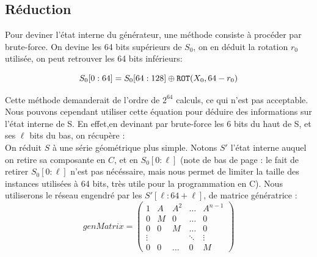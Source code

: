 \documentclass[preprint]{iacrtrans}
\begin{document}
\subsection{Réduction}
Pour deviner l'état interne du générateur, une méthode consiste à procéder par brute-force. On devine les 64 bits supérieurs de $S_0$, on en déduit la rotation $r_0$ utilisée, on peut retrouver  les 64 bits inférieurs:

\begin{equation}
   S_0[0:64] = S_0[64:128] \oplus \texttt{ROT}(X_0 , 64 - r_0) \\
\end{equation}

Cette méthode demanderait de l'ordre de $2^{64}$ calculs, ce qui n'est pas acceptable. Nous pouvons cependant utiliser cette équation pour déduire des informations sur l'état interne de S. En effet,en devinant par brute-force les 6 bits du haut de S, et ses $\ell$ bits du bas, on récupère :\\%

On réduit $S$ à une série géométrique plus simple. Notons $S'$ l'état interne auquel on retire sa composante en $C$, et en $S_0[0:\ell]$ (note de bas de page : le fait de retirer $S_0[0:\ell]$ n'est pas nécéssaire, mais nous permet de limiter la taille des instances utilisées à 64 bits, très utile pour la programmation en C). Nous utiliserons le réseau engendré par les $S'[\ell : 64 + \ell]$, de matrice génératrice :\\
\begin{equation}
genMatrix =
\begin{pmatrix} 
1 & A & A ^2 & \dots & A ^{n- 1}\\
0 & M & 0 & \dots & 0\\
0 & 0 & M & \dots & 0\\
\vdots & & & \ddots & \vdots\\
0 & 0 & \dots & 0 & M
\end{pmatrix}
\end{equation}
\end{document}
